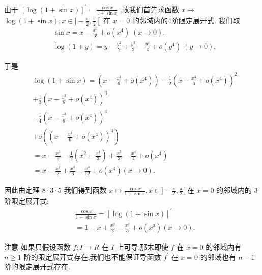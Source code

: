 由于 ${\left\lbrack  \log \left( 1 + \sin x\right) \right\rbrack  }^{\prime } = \frac{\cos x}{1 + \sin x}$ ,故我们首先求函数 $x \mapsto$  $\log \left( {1 + \sin x}\right) ,x \in  \rbrack  - \frac{\pi }{2},\frac{\pi }{2}\left\lbrack  {\text{ 在 }x = 0}\right.$ 的邻域内的4阶限定展开式. 我们取
\begin{align*}
	&\sin x = x - \frac{{x}^{3}}{3!} + o\left( {x}^{4}\right) \;\left( {x \rightarrow  0}\right) ,\\
	&\log \left( {1 + y}\right)  = y - \frac{{y}^{2}}{2} + \frac{{y}^{3}}{3} - \frac{{y}^{4}}{4} + o\left( {y}^{4}\right) \;\left( {y \rightarrow  0}\right) ,
\end{align*}

于是
\begin{align*}
	&\log \left( {1 + \sin x}\right)  = \left( {x - \frac{{x}^{3}}{6} + o\left( {x}^{4}\right) }\right)  - \frac{1}{2}{\left( x - \frac{{x}^{3}}{6} + o\left( {x}^{4}\right) \right) }^{2}\\
	&+ \frac{1}{3}{\left( x - \frac{{x}^{3}}{6} + o\left( {x}^{4}\right) \right) }^{3}\\
	&- \frac{1}{4}{\left( x - \frac{{x}^{3}}{6} + o\left( {x}^{4}\right) \right) }^{4}\\
	&+ o\left( {\left( x - \frac{{x}^{3}}{6} + o\left( {x}^{4}\right) \right) }^{4}\right)\\
	&= x - \frac{{x}^{3}}{6} - \frac{1}{2}\left( {{x}^{2} - \frac{{x}^{4}}{3}}\right)  + \frac{{x}^{3}}{3} - \frac{{x}^{4}}{4} + o\left( {x}^{4}\right)\\
	&= x - \frac{{x}^{2}}{2} + \frac{{x}^{3}}{6} - \frac{{x}^{4}}{12} + o\left( {x}^{4}\right) \left( {x \rightarrow  0}\right) .
\end{align*}

因此由定理 $8 \cdot  3 \cdot  5$ 我们得到函数 $x \mapsto  \frac{\cos x}{1 + \sin x},x \in  \rbrack  - \frac{\pi }{2},\frac{\pi }{2}\lbrack$ 在 $x = 0$ 的邻域内的 3 阶限定展开式:
\begin{align*}
	&\frac{\cos x}{1 + \sin x} = {\left\lbrack  \log \left( 1 + \sin x\right) \right\rbrack  }^{\prime }\\
	&= 1 - x + \frac{{x}^{2}}{2} - \frac{{x}^{3}}{3} + o\left( {x}^{3}\right) \left( {x \rightarrow  0}\right) .
\end{align*}

注意 如果只假设函数 $f : I \rightarrow  R$ 在 $I$ 上可导,那末即使 $f$ 在 $x = 0$ 的邻域内有 $n \geq  1$ 阶的限定展开式存在,我们也不能保证导函数 ${f}^{\prime }$ 在 $x = 0$ 的邻域也有 $n - 1$ 阶的限定展开式存在.


